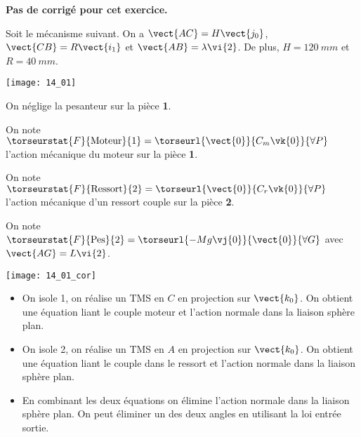 \normalfalse \difficiletrue \tdifficilefalse
\correctiontrue


\setcounter{question}{0}
\ifcorrection
\else
\textbf{Pas de corrigé pour cet exercice.}
\fi

\ifprof
\else
Soit le mécanisme suivant. On a $\vect{AC}=H\vect{j_0}$,  $\vect{CB}=R\vect{i_1}$ et $\vect{AB} = \lambda\vi{2}$. De plus, 
$H=\SI{120}{mm}$ et $R=\SI{40}{mm}$. 

\begin{center}
\texttt{[image: 14\_01]}
\end{center}
\fi

On néglige la pesanteur sur la pièce \textbf{1}. 

On note $\torseurstat{F}{\text{Moteur}}{1} = \torseurl{\vect{0}}{C_m\vk{0}}{\forall P}$ l'action mécanique du moteur sur la pièce \textbf{1}.

On note $\torseurstat{F}{\text{Ressort}}{2} = \torseurl{\vect{0}}{C_r\vk{0}}{\forall P}$ l'action mécanique d'un ressort couple sur la pièce \textbf{2}. 

On note $\torseurstat{F}{\text{Pes}}{2} = \torseurl{-Mg\vj{0}}{\vect{0}}{\forall G}$ avec $\vect{AG}=L\vi{2}$. 

\ifprof
\begin{center}
\texttt{[image: 14\_01\_cor]}
\end{center}
\else
\fi

\ifprof
\begin{itemize}
\item On isole 1, on réalise un TMS en $C$ en projection sur $\vect{k_0}$. On obtient une équation liant le couple moteur et l'action normale dans la liaison sphère plan. 
\item On isole 2, on réalise un TMS en $A$ en projection sur $\vect{k_0}$. On obtient une équation liant le couple dans le ressort et l'action normale dans la liaison sphère plan. 
\item En combinant les deux équations on élimine l'action normale dans la liaison sphère plan. On peut éliminer un des deux angles en utilisant la loi entrée sortie.
\end{itemize}
\else
\fi


